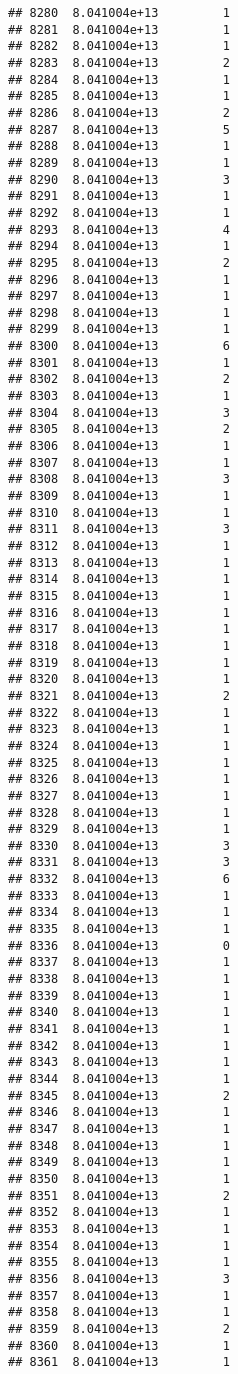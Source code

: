 \documentclass[
]{article}
\begin{document}
\begin{verbatim}
## 8280  8.041004e+13         1
## 8281  8.041004e+13         1
## 8282  8.041004e+13         1
## 8283  8.041004e+13         2
## 8284  8.041004e+13         1
## 8285  8.041004e+13         1
## 8286  8.041004e+13         2
## 8287  8.041004e+13         5
## 8288  8.041004e+13         1
## 8289  8.041004e+13         1
## 8290  8.041004e+13         3
## 8291  8.041004e+13         1
## 8292  8.041004e+13         1
## 8293  8.041004e+13         4
## 8294  8.041004e+13         1
## 8295  8.041004e+13         2
## 8296  8.041004e+13         1
## 8297  8.041004e+13         1
## 8298  8.041004e+13         1
## 8299  8.041004e+13         1
## 8300  8.041004e+13         6
## 8301  8.041004e+13         1
## 8302  8.041004e+13         2
## 8303  8.041004e+13         1
## 8304  8.041004e+13         3
## 8305  8.041004e+13         2
## 8306  8.041004e+13         1
## 8307  8.041004e+13         1
## 8308  8.041004e+13         3
## 8309  8.041004e+13         1
## 8310  8.041004e+13         1
## 8311  8.041004e+13         3
## 8312  8.041004e+13         1
## 8313  8.041004e+13         1
## 8314  8.041004e+13         1
## 8315  8.041004e+13         1
## 8316  8.041004e+13         1
## 8317  8.041004e+13         1
## 8318  8.041004e+13         1
## 8319  8.041004e+13         1
## 8320  8.041004e+13         1
## 8321  8.041004e+13         2
## 8322  8.041004e+13         1
## 8323  8.041004e+13         1
## 8324  8.041004e+13         1
## 8325  8.041004e+13         1
## 8326  8.041004e+13         1
## 8327  8.041004e+13         1
## 8328  8.041004e+13         1
## 8329  8.041004e+13         1
## 8330  8.041004e+13         3
## 8331  8.041004e+13         3
## 8332  8.041004e+13         6
## 8333  8.041004e+13         1
## 8334  8.041004e+13         1
## 8335  8.041004e+13         1
## 8336  8.041004e+13         0
## 8337  8.041004e+13         1
## 8338  8.041004e+13         1
## 8339  8.041004e+13         1
## 8340  8.041004e+13         1
## 8341  8.041004e+13         1
## 8342  8.041004e+13         1
## 8343  8.041004e+13         1
## 8344  8.041004e+13         1
## 8345  8.041004e+13         2
## 8346  8.041004e+13         1
## 8347  8.041004e+13         1
## 8348  8.041004e+13         1
## 8349  8.041004e+13         1
## 8350  8.041004e+13         1
## 8351  8.041004e+13         2
## 8352  8.041004e+13         1
## 8353  8.041004e+13         1
## 8354  8.041004e+13         1
## 8355  8.041004e+13         1
## 8356  8.041004e+13         3
## 8357  8.041004e+13         1
## 8358  8.041004e+13         1
## 8359  8.041004e+13         2
## 8360  8.041004e+13         1
## 8361  8.041004e+13         1

\end{verbatim}
\end{document}
